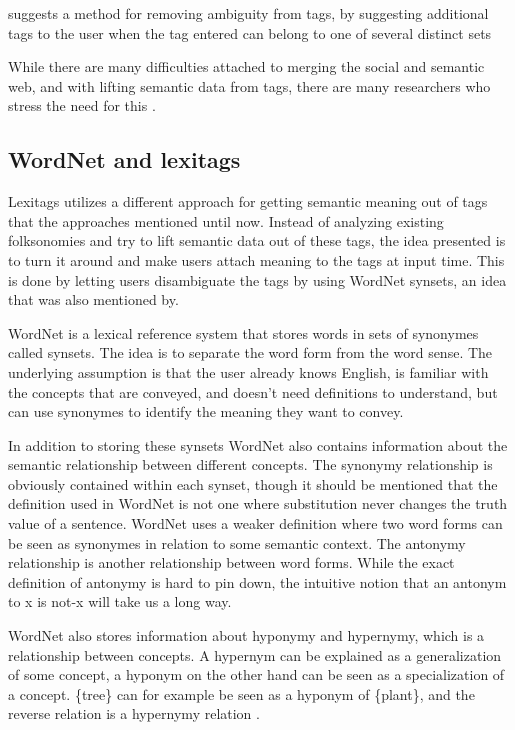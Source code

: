 \citet{Weinberger2008} suggests a method for removing ambiguity from tags,
 by suggesting additional tags to the user when the tag entered can belong to one of several distinct sets 

While there are many difficulties attached to merging the social and semantic web, and with lifting semantic data from tags, there are many researchers who stress the need for this \citep{Passant2007,Mika2005, Gruber2007}.

\subsection{WordNet and lexitags}
Lexitags \citep{Veres2011} utilizes a different approach for getting semantic meaning out of tags that the approaches mentioned until now. 
Instead of analyzing existing folksonomies and try to lift semantic data out of these tags, the idea presented is to turn it around and make users attach meaning to the tags at input time.
This is done by letting users disambiguate the tags by using WordNet synsets, an idea that was also mentioned by.

WordNet is a lexical reference system that stores words in sets of synonymes called synsets. The idea is to separate the word form from the word sense. 
The underlying assumption is that the user already knows English, is familiar with the concepts that are conveyed, 
and doesn't need definitions to understand, but can use synonymes to identify the meaning they want to convey\citep{Miller1990}.

In addition to storing these synsets WordNet also contains information about the semantic relationship between different concepts. 
The synonymy relationship is obviously contained within each synset, 
though it should be mentioned that the definition used in WordNet is not one where substitution never changes the truth value of a sentence. 
WordNet uses a weaker definition where two word forms can be seen as synonymes in relation to some semantic context. 
The antonymy relationship is another relationship between word forms. While the exact definition of antonymy is hard to pin down, the intuitive notion that an antonym to x is not-x will take us a long way\citep{Miller1990}.

WordNet also stores information about hyponymy and hypernymy, which is a relationship between concepts.
 A hypernym can be explained as a generalization of some concept, a hyponym on the other hand can be seen as a specialization of a concept. 
 \{tree\} can for example be seen as a hyponym of \{plant\}, and the reverse relation is a hypernymy relation \citep{Veres2010}.

